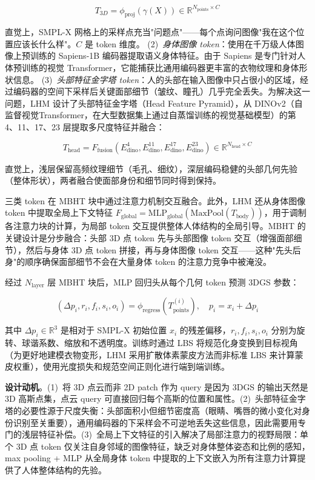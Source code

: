 \[
T_{3D} = \phi_{\text{proj}}(\gamma(X)) \in \mathbb{R}^{N_{\text{points}} \times C}
\]

直觉上，SMPL-X 网格上的采样点充当"问题点"——每个点询问图像"我在这个位置应该长什么样"。$C$ 是 token 维度。
(2)~\textit{身体图像 token}：使用在千万级人体图像上预训练的 Sapiens-1B 编码器提取语义身体特征。由于 Sapiens 是专门针对人体预训练的视觉 Transformer，它能捕获比通用编码器更丰富的衣物纹理和身体形状信息。
(3)~\textit{头部特征金字塔 token}：人的头部在输入图像中只占很小的区域，经过编码器的空间下采样后关键面部细节（皱纹、瞳孔）几乎完全丢失。为解决这一问题，LHM 设计了头部特征金字塔（Head Feature Pyramid），从 DINOv2（自监督视觉Transformer，在大型数据集上通过自蒸馏训练的视觉基础模型）的第 4、11、17、23 层提取多尺度特征并融合：

\[
T_{\text{head}} = F_{\text{fusion}}(E_{\text{dino}}^4, E_{\text{dino}}^{11}, E_{\text{dino}}^{17}, E_{\text{dino}}^{23}) \in \mathbb{R}^{N_{\text{head}} \times C}
\]

直觉上，浅层保留高频纹理细节（毛孔、细纹），深层编码稳健的头部几何先验（整体形状），两者融合使面部身份和细节同时得到保持。

三类 token 在 MBHT 块中通过注意力机制交互融合。此外，LHM 还从身体图像 token 中提取全局上下文特征 $F_{\text{global}} = \text{MLP}_{\text{global}}(\text{MaxPool}(T_{\text{body}}))$，用于调制各注意力块的计算，为局部 token 交互提供整体人体结构的全局引导。MBHT 的关键设计是分步融合：头部 3D 点 token 先与头部图像 token 交互（增强面部细节），然后与身体 3D 点 token 拼接，再与身体图像 token 交互——这种"先头后身"的顺序确保面部细节不会在大量身体 token 的注意力竞争中被淹没。

经过 $N_{\text{layer}}$ 层 MBHT 块后，MLP 回归头从每个几何 token 预测 3DGS 参数：

\[
(\Delta p_i, r_i, f_i, s_i, o_i) = \phi_{\text{regress}}(T_{\text{points}}^{(i)}), \quad p_i = x_i + \Delta p_i
\]

其中 $\Delta p_i \in \mathbb{R}^3$ 是相对于 SMPL-X 初始位置 $x_i$ 的残差偏移，$r_i, f_i, s_i, o_i$ 分别为旋转、球谐系数、缩放和不透明度。训练时通过 LBS 将规范化身变换到目标视角（为更好地建模衣物变形，LHM 采用扩散体素蒙皮方法而非标准 LBS 来计算蒙皮权重），使用光度损失和规范空间正则化进行端到端训练。

\textbf{设计动机}。(1)~将 3D 点云而非 2D patch 作为 query 是因为 3DGS 的输出天然是 3D 高斯点集，点云 query 可直接回归每个高斯的位置和属性。(2)~头部特征金字塔的必要性源于尺度失衡：头部面积小但细节密度高（眼睛、嘴唇的微小变化对身份识别至关重要），通用编码器的下采样会不可逆地丢失这些信息，因此需要用专门的浅层特征补偿。(3)~全局上下文特征的引入解决了局部注意力的视野局限：单个 3D 点 token 仅关注自身邻域的图像特征，缺乏对身体整体姿态和比例的感知，max pooling + MLP 从全局身体 token 中提取的上下文嵌入为所有注意力计算提供了人体整体结构的先验。

